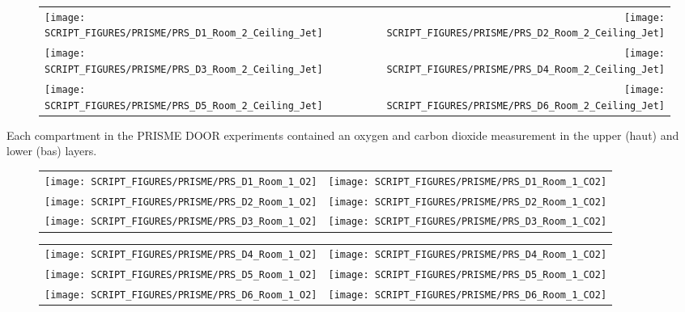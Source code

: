 \begin{figure}[p]
\begin{tabular*}{\textwidth}{l@{\extracolsep{\fill}}r}
\texttt{[image: SCRIPT\_FIGURES/PRISME/PRS\_D1\_Room\_2\_Ceiling\_Jet]} &
\texttt{[image: SCRIPT\_FIGURES/PRISME/PRS\_D2\_Room\_2\_Ceiling\_Jet]} \\
\texttt{[image: SCRIPT\_FIGURES/PRISME/PRS\_D3\_Room\_2\_Ceiling\_Jet]} &
\texttt{[image: SCRIPT\_FIGURES/PRISME/PRS\_D4\_Room\_2\_Ceiling\_Jet]} \\
\texttt{[image: SCRIPT\_FIGURES/PRISME/PRS\_D5\_Room\_2\_Ceiling\_Jet]} &
\texttt{[image: SCRIPT\_FIGURES/PRISME/PRS\_D6\_Room\_2\_Ceiling\_Jet]}
\end{tabular*}
\label{PRISME_Ceiling_Jet_Room_2}
\end{figure}

\clearpage

Each compartment in the PRISME DOOR experiments contained an oxygen and carbon dioxide measurement in the upper (haut) and lower (bas) layers.

\begin{figure}[!ht]
\begin{tabular*}{\textwidth}{l@{\extracolsep{\fill}}r}
\texttt{[image: SCRIPT\_FIGURES/PRISME/PRS\_D1\_Room\_1\_O2]} &
\texttt{[image: SCRIPT\_FIGURES/PRISME/PRS\_D1\_Room\_1\_CO2]} \\
\texttt{[image: SCRIPT\_FIGURES/PRISME/PRS\_D2\_Room\_1\_O2]} &
\texttt{[image: SCRIPT\_FIGURES/PRISME/PRS\_D2\_Room\_1\_CO2]} \\
\texttt{[image: SCRIPT\_FIGURES/PRISME/PRS\_D3\_Room\_1\_O2]} &
\texttt{[image: SCRIPT\_FIGURES/PRISME/PRS\_D3\_Room\_1\_CO2]}
\end{tabular*}
\label{PRISME_Gas_1}
\end{figure}

\begin{figure}[p]
\begin{tabular*}{\textwidth}{l@{\extracolsep{\fill}}r}
\texttt{[image: SCRIPT\_FIGURES/PRISME/PRS\_D4\_Room\_1\_O2]} &
\texttt{[image: SCRIPT\_FIGURES/PRISME/PRS\_D4\_Room\_1\_CO2]} \\
\texttt{[image: SCRIPT\_FIGURES/PRISME/PRS\_D5\_Room\_1\_O2]} &
\texttt{[image: SCRIPT\_FIGURES/PRISME/PRS\_D5\_Room\_1\_CO2]} \\
\texttt{[image: SCRIPT\_FIGURES/PRISME/PRS\_D6\_Room\_1\_O2]} &
\texttt{[image: SCRIPT\_FIGURES/PRISME/PRS\_D6\_Room\_1\_CO2]}
\end{tabular*}
\label{PRISME_Gas_2}
\end{figure}

